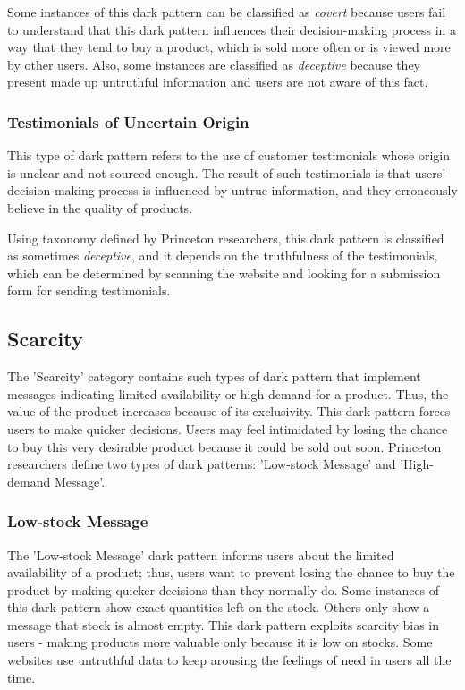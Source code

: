         Some instances of this dark pattern can be classified as \emph{covert} because users fail to understand that this dark pattern influences their decision-making process in a way that they tend to buy a product, which is sold more often or is viewed more by other users. Also, some instances are classified as \emph{deceptive} because they present made up untruthful information and users are not aware of this fact.
        \subsubsection{Testimonials of Uncertain Origin}
        This type of dark pattern refers to the use of customer testimonials whose origin is unclear and not sourced enough. The result of such testimonials is that users' decision-making process is influenced by untrue information, and they erroneously believe in the quality of products.
        
        Using taxonomy defined by Princeton researchers, this dark pattern is classified as sometimes \emph{deceptive}, and it depends on the truthfulness of the testimonials, which can be determined by scanning the website and looking for a submission form for sending testimonials.

    \subsection{Scarcity}
    The 'Scarcity' category contains such types of dark pattern that implement messages indicating limited availability or high demand for a product. Thus, the value of the product increases because of its exclusivity. This dark pattern forces users to make quicker decisions. Users may feel intimidated by losing the chance to buy this very desirable product because it could be sold out soon. Princeton researchers define two types of dark patterns: 'Low-stock Message' and 'High-demand Message'.
        \subsubsection{Low-stock Message}
        The 'Low-stock Message' dark pattern informs users about the limited availability of a product; thus, users want to prevent losing the chance to buy the product by making quicker decisions than they normally do. Some instances of this dark pattern show exact quantities left on the stock. Others only show a message that stock is almost empty. This dark pattern exploits scarcity bias in users - making products more valuable only because it is low on stocks. Some websites use untruthful data to keep arousing the feelings of need in users all the time.

